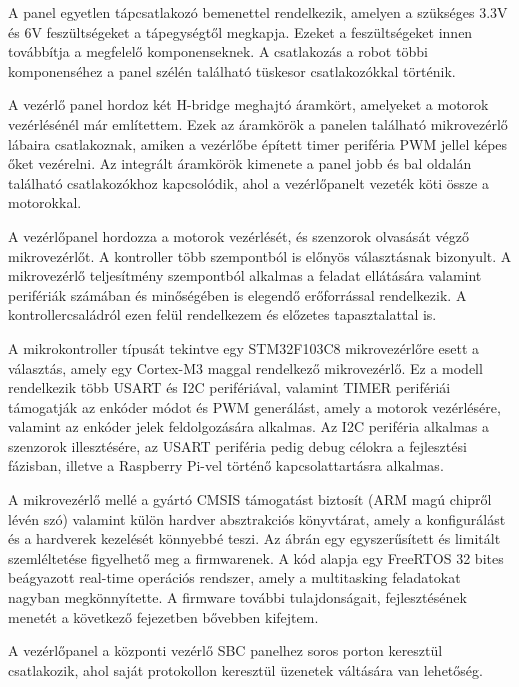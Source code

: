 A panel egyetlen tápcsatlakozó bemenettel rendelkezik, amelyen a szükséges 3.3V
és 6V feszültségeket a tápegységtől megkapja. Ezeket a feszültségeket innen
továbbítja a megfelelő komponenseknek. A csatlakozás a robot többi komponenséhez
a panel szélén található tüskesor csatlakozókkal történik.

\medskip

A vezérlő panel hordoz két H-bridge meghajtó áramkört, amelyeket a motorok
vezérlésénél már említettem. Ezek az áramkörök a panelen található mikrovezérlő
lábaira csatlakoznak, amiken a vezérlőbe épített timer periféria PWM jellel képes
őket vezérelni. Az integrált áramkörök kimenete a panel jobb és bal oldalán
található csatlakozókhoz kapcsolódik, ahol a vezérlőpanelt vezeték köti össze a
motorokkal.

\medskip

A vezérlőpanel hordozza a motorok vezérlését, és szenzorok olvasását végző
mikrovezérlőt. A kontroller több szempontból is előnyös választásnak bizonyult. A
mikrovezérlő teljesítmény szempontból alkalmas a feladat ellátására valamint
perifériák számában és minőségében is elegendő erőforrással rendelkezik. A
kontrollercsaládról ezen felül rendelkezem és előzetes tapasztalattal is.

A mikrokontroller típusát tekintve egy STM32F103C8 mikrovezérlőre
esett a választás, amely egy Cortex-M3 maggal rendelkező
mikrovezérlő. Ez a modell rendelkezik több USART és I2C perifériával,
valamint TIMER perifériái támogatják az enkóder módot és PWM
generálást, amely a motorok vezérlésére, valamint az enkóder jelek
feldolgozására alkalmas. Az I2C periféria alkalmas a szenzorok
illesztésére, az USART periféria pedig debug célokra a fejlesztési
fázisban, illetve a Raspberry Pi-vel történő kapcsolattartásra
alkalmas\cite{stm32source}.

A mikrovezérlő mellé a gyártó CMSIS támogatást biztosít (ARM magú chipről lévén
szó) valamint külön hardver absztrakciós könyvtárat, amely a konfigurálást és a
hardverek kezelését könnyebbé teszi. Az ábrán egy egyszerűsített és limitált
szemléltetése figyelhető meg a firmwarenek. A kód alapja egy FreeRTOS 32 bites
beágyazott real-time operációs rendszer, amely a multitasking feladatokat nagyban
megkönnyítette. A firmware további tulajdonságait, fejlesztésének menetét a
következő fejezetben bővebben kifejtem.

A vezérlőpanel a központi vezérlő SBC panelhez soros porton keresztül
csatlakozik, ahol saját protokollon keresztül üzenetek váltására van lehetőség. 

